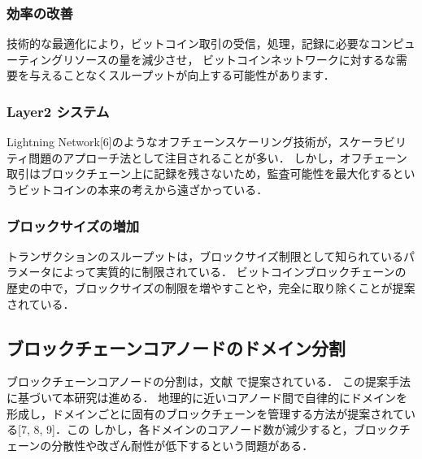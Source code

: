 \documentclass[a4paper,12pt]{jsarticle}
\begin{document}
\subsubsection{効率の改善}%
技術的な最適化により，ビットコイン取引の受信，処理，記録に必要なコンピューティングリソースの量を減少させ，
ビットコインネットワークに対するな需要を与えることなくスループットが向上する可能性があります．

\subsubsection{Layer2 システム}%
Lightning Network[6]のようなオフチェーンスケーリング技術が，スケーラビリティ問題のアプローチ法として注目されることが多い．
しかし，オフチェーン取引はブロックチェーン上に記録を残さないため，監査可能性を最大化するというビットコインの本来の考えから遠ざかっている．

\subsubsection{ブロックサイズの増加}%
トランザクションのスループットは，ブロックサイズ制限として知られているパラメータによって実質的に制限されている．
ビットコインブロックチェーンの歴史の中で，ブロックサイズの制限を増やすことや，完全に取り除くことが提案されている．



\subsection{ブロックチェーンコアノードのドメイン分割}
ブロックチェーンコアノードの分割は，文献 \cite{fujihara1}\cite{fujihara2}で提案されている．
この提案手法に基づいて本研究は進める．
地理的に近いコアノード間で自律的にドメインを形成し，ドメインごとに固有のブロックチェーンを管理する方法が提案されている[7, 8, 9]．この
しかし，各ドメインのコアノード数が減少すると，ブロックチェーンの分散性や改ざん耐性が低下するという問題がある．
\end{document}

